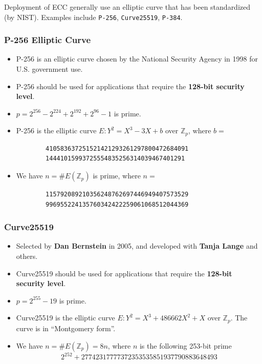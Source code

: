 \documentclass[12pt,titlepage]{article}
\begin{document}
Deployment of ECC generally use an elliptic curve that has been standardized (by NIST). Examples include \texttt{P-256}, \texttt{Curve25519}, \texttt{P-384}. 

\subsubsection{P-256 Elliptic Curve}
\begin{itemize}
	\item P-256 is an elliptic curve chosen by the National Security Agency in 1998 for U.S. government use.
	\item P-256 should be used for applications that require the \textbf{128-bit security level}.
	\item $p = 2^{256} - 2^{224} + 2^{192} + 2^{96} - 1$ is prime.
	\item P-256 is the elliptic curve $E : Y^2 = X^3 - 3X + b$ over $\mathbb{Z}_p$, where $b = $
	\begin{verbatim}
		410583637251521421293261297800472684091
		14441015993725554835256314039467401291
	\end{verbatim}
	\item We have $n = \#E(\mathbb{Z}_p)$ is prime, where $n = $
	\begin{verbatim}
		115792089210356248762697446949407573529
		996955224135760342422259061068512044369
	\end{verbatim}
\end{itemize}

\subsubsection{Curve25519}
\begin{itemize}
	\item Selected by \textbf{Dan Bernstein} in 2005, and developed with \textbf{Tanja Lange} and others.
	\item Curve25519 should be used for applications that require the  \textbf{128-bit security level}.
	\item $p = 2^{255} - 19$ is prime.
	\item Curve25519 is the elliptic curve $E : Y^2 = X^3 + 486662X^2 + X$ over $\mathbb{Z}_p$. The curve is in ``Montgomery form''.
	\item We have $n = \#E(\mathbb{Z}_p) = 8n$, where $n$ is the following 253-bit prime $$2^{252} + 27742317777372353535851937790883648493$$
\end{itemize}
\end{document}
